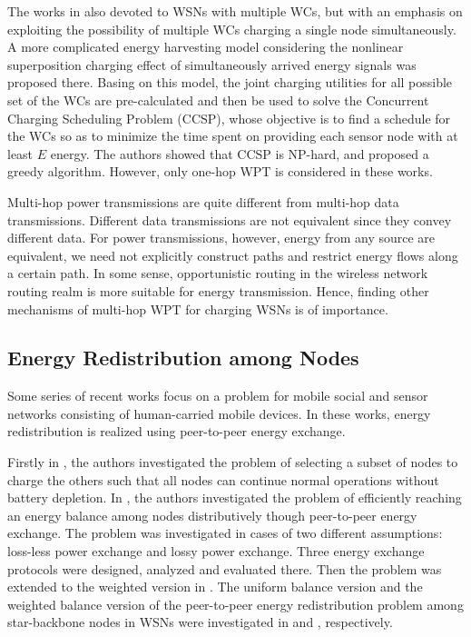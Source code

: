 \documentclass[journal,10pt]{IEEEtran}
\begin{document}
The works in \cite{Guo2017,Guo2016} also devoted to WSNs with multiple WCs, but with an emphasis on exploiting the possibility of multiple WCs charging a single node simultaneously. A more complicated energy harvesting model considering the nonlinear superposition charging effect of simultaneously arrived energy signals was proposed there. Basing on this model, the joint charging utilities for all possible set of the WCs are pre-calculated and then be used to solve the Concurrent Charging Scheduling Problem (CCSP), whose objective is to find a schedule for the WCs so as to minimize the time spent on providing each sensor node with at least $E$ energy. The authors showed that CCSP is NP-hard, and proposed a greedy algorithm. However, only one-hop WPT is considered in these works.

Multi-hop power transmissions are quite different from multi-hop data transmissions. Different data transmissions are not equivalent since they convey different data. For power transmissions, however, energy from any source are equivalent, we need not explicitly construct paths and restrict energy flows along a certain path. In some sense, opportunistic routing in the wireless network routing realm is more suitable for energy transmission. Hence, finding other mechanisms of multi-hop WPT for charging WSNs is of importance.

\subsection{Energy Redistribution among Nodes}

Some series of recent works \cite{Bulut2014,Niko2016,Niko2017,Madhja2016,Madhja2017} focus on a problem for mobile social and sensor networks consisting of human-carried mobile devices. In these works, energy redistribution is realized using peer-to-peer energy exchange.

Firstly in \cite{Bulut2014}, the authors investigated the problem of selecting a subset of nodes to charge the others such that all nodes can continue normal operations without battery depletion. In \cite{Niko2016}, the authors investigated the problem of efficiently reaching an energy balance among nodes distributively though peer-to-peer energy exchange. The problem was investigated in cases of two different assumptions: loss-less power exchange and lossy power exchange. Three energy exchange protocols were designed, analyzed and evaluated there. Then the problem was extended to the weighted version in \cite{Niko2017}. The uniform balance version and the weighted balance version of the peer-to-peer energy redistribution problem among star-backbone nodes in WSNs were investigated in \cite{Madhja2016} and \cite{Madhja2017}, respectively.
\end{document}
